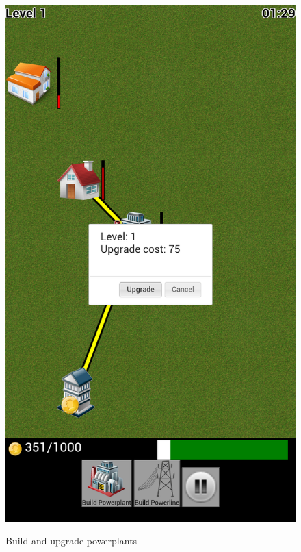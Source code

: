 \begin{figure}[H]
{		\includegraphics[scale=0.18]{pictures/sprint4-screen/upgradepowerplant}
	}
	\caption{Build and upgrade powerplants}
\end{figure}

